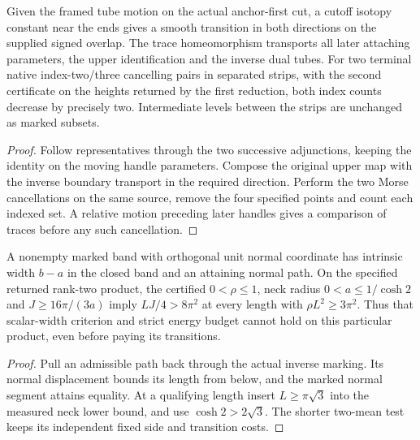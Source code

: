 \begin{proposition}
\label{prop:ed45-relative-pair}
\leanok
Given the framed tube motion on the actual anchor-first cut, a cutoff
isotopy constant near the ends gives a smooth transition in both directions
on the supplied signed overlap. The trace homeomorphism transports all
later attaching parameters, the upper identification and the inverse
dual tubes. For two terminal native index-two/three cancelling pairs
in separated strips, with the second certificate on the heights returned
by the first reduction, both index counts decrease by precisely two.
Intermediate levels between the strips are unchanged as marked subsets.
\end{proposition}
\begin{proof}
\leanok
Follow representatives through the two successive adjunctions, keeping
the identity on the moving handle parameters. Compose the original upper
map with the inverse boundary transport in the required direction.
Perform the two Morse cancellations on the same source, remove the four
specified points and count each indexed set. A relative motion preceding
later handles gives a comparison of traces before any such cancellation.
\end{proof}

\begin{proposition}
\label{prop:ed45-returned-width}
\leanok
A nonempty marked band with orthogonal unit normal coordinate has
intrinsic width $b-a$ in the closed band and an attaining normal path.
On the specified returned rank-two product, the certified $0<\rho\le1$,
neck radius $0<a\le1/\cosh 2$ and $J\ge16\pi/(3a)$ imply
$LJ/4>8\pi^2$ at every length with $\rho L^2\ge3\pi^2$.
Thus that scalar-width criterion and strict energy budget cannot hold
on this particular product, even before paying its transitions.
\end{proposition}
\begin{proof}
\leanok
Pull an admissible path back through the actual inverse marking. Its
normal displacement bounds its length from below, and the marked normal
segment attains equality. At a qualifying length insert
$L\ge\pi\sqrt3$ into the measured neck lower bound, and use
$\cosh 2>2\sqrt3$. The shorter two-mean test keeps its independent
fixed side and transition costs.
\end{proof}

